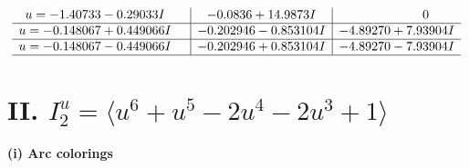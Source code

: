 \documentclass[1p]{elsarticle_modified}
\theoremstyle{definition}
\begin{document}
$$\begin{array}{c|c|c}
\begin{aligned}
u &= -1.40733 - 0.29033 I\end{aligned}
 & -0.0836 + 14.9873 I & \phantom{-0.000000 } 0 \\ \hline\begin{aligned}
u &= -0.148067 + 0.449066 I\end{aligned}
 & -0.202946 - 0.853104 I & -4.89270 + 7.93904 I \\ \hline\begin{aligned}
u &= -0.148067 - 0.449066 I\end{aligned}
 & -0.202946 + 0.853104 I & -4.89270 - 7.93904 I\\
 \hline 
 \end{array}$$\newpage\newpage\renewcommand{\arraystretch}{1}
\centering \section*{II. $I^u_{2}= \langle u^6+u^5-2 u^4-2 u^3+1 \rangle$}
\flushleft \textbf{(i) Arc colorings}\\
\end{document}
